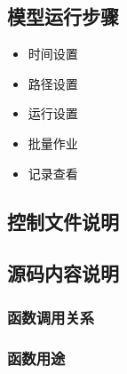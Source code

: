 \documentclass{article}
\begin{document}
\subsection{模型运行步骤}

\begin{itemize}

\item 时间设置

\item 路径设置

\item 运行设置

\item 批量作业

\item 记录查看

\end{itemize}

\subsection{控制文件说明}

\subsection{源码内容说明}

\subsubsection{函数调用关系}

\subsubsection{函数用途}
\end{document}
